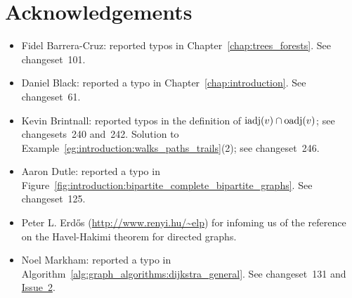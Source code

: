 
\chapter{Acknowledgements}

\begin{itemize}
\item Fidel Barrera-Cruz: reported typos in
  Chapter~\ref{chap:trees_forests}. See changeset~101.

\item Daniel Black: reported a typo in
  Chapter~\ref{chap:introduction}. See changeset~61.

\item Kevin Brintnall: reported typos in the definition of
  $\operatorname*{iadj}(v) \cap \operatorname*{oadj}(v)$; see changesets~240 and~242. Solution to
  Example~\ref{eg:introduction:walks_paths_trails}(2); see changeset~246.

\item Aaron Dutle: reported a typo in
  Figure~\ref{fig:introduction:bipartite_complete_bipartite_graphs}. See
  changeset~125.

\item Peter L. Erd\H{o}s (\url{http://www.renyi.hu/~elp}) for infoming
  us of the reference~\cite{ErdosEtal2010} on the Havel-Hakimi
  theorem for directed graphs.

\item Noel Markham: reported a typo in
  Algorithm~\ref{alg:graph_algorithms:dijkstra_general}. See
  changeset~131 and
  \href{http://code.google.com/p/graph-theory-algorithms-book/issues/detail?id=2}{Issue~2}.
\end{itemize}
